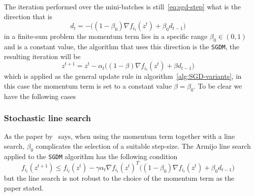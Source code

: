 The iteration performed over the mini-batches is still~\eqref{eq:sgd-step} what is the direction that is
\[
d_t=-\bigl((1-\beta_0)\nabla f_{i_t}(z^t)+\beta_0d_{t-1}\bigr)
\]
in a finite-sum problem the momentum term lies in a specific range $\beta_0\in(0,1)$ and is a constant value, the algorithm that uses this direction is the \texttt{SGDM}, the resulting iteration will be
\begin{equation}\label{eq:sgdm-step}
z^{t+1}=z^t-\alpha_t\bigl((1-\beta)\nabla f_{i_t}(z^t)+\beta d_{t-1}\bigr)
\end{equation}
which is applied as the general update rule in algorithm~\ref{alg:SGD-variants}, in this case the momentum term is set to a constant value $\beta=\beta_0$. To be clear we have the following cases
\begin{center}
\end{center}

\subsubsection{Stochastic line search}

As the paper by~\textcite{fan_msl_2023} says, when using the momentum term together with a line search, $\beta_0$ complicates the selection of a suitable step-size. The Armijo line search applied to the \texttt{SGDM} algorithm has the following condition
\begin{equation}\label{eq:armijo-sgdm}
f_{i_t}(z^{t+1})\leq f_{i_t}(z^t)-\gamma\alpha_t\nabla f_{i_t}(z^t)^T\bigl((1-\beta_0)\nabla f_{i_t}(z^t)+\beta_0d_{t-1}\bigr)
\end{equation}
but the line search is not robust to the choice of the momentum term as the paper stated.

